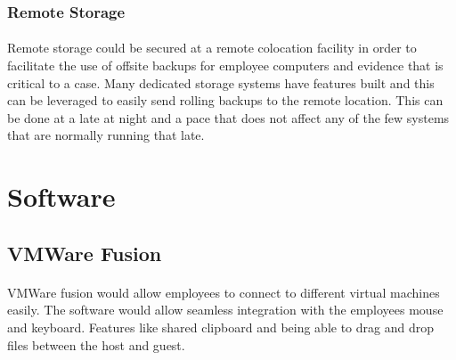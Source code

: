 \documentclass{article}
\begin{document}
\subsubsection{Remote Storage}
\paragraph{}
Remote storage could be secured at a remote colocation facility in order to facilitate the use of offsite backups for employee computers and evidence that is critical to a case. 
Many dedicated storage systems have features built and this can be leveraged to easily send rolling backups to the remote location. 
This can be done at a late at night and a pace that does not affect any of the few systems that are normally running that late. 

\section{Software}
\subsection{VMWare Fusion} 
\paragraph{}
VMWare fusion would allow employees to connect to different virtual machines easily.
The software would allow seamless integration with the employees mouse and keyboard. 
Features like shared clipboard and being able to drag and drop files between the host and guest.
\end{document}
